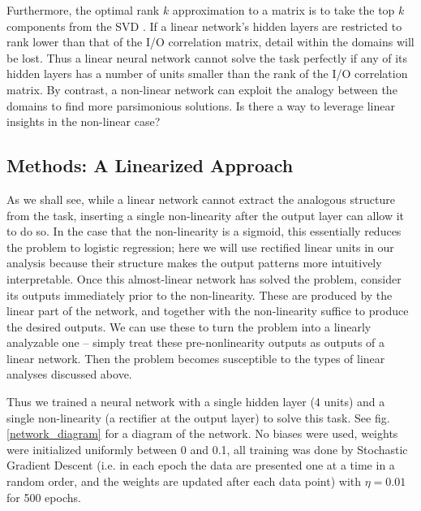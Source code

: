 \documentclass[10pt,letterpaper]{article}
\begin{document}
Furthermore, the optimal rank $k$ approximation to a matrix is to take the top $k$ components from the SVD \citep{Mirsky1960}. If a linear network's hidden layers are restricted to rank lower than that of the I/O correlation matrix, detail within the domains will be lost. Thus a linear neural network cannot solve the task perfectly if any of its hidden layers has a number of units smaller than the rank of the I/O correlation matrix. By contrast, a non-linear network can exploit the analogy between the domains to find more parsimonious solutions. Is there a way to leverage linear insights in the non-linear case?  
\subsection{Methods: A Linearized Approach}
As we shall see, while a linear network cannot extract the analogous structure from the task, inserting a single non-linearity after the output layer can allow it to do so. In the case that the non-linearity is a sigmoid, this essentially reduces the problem to logistic regression; here we will use rectified linear units in our analysis because their structure makes the output patterns more intuitively interpretable. Once this almost-linear network has solved the problem, consider its outputs immediately prior to the non-linearity. These are produced by the linear part of the network, and together with the non-linearity suffice to produce the desired outputs. We can use these to turn the problem into a linearly analyzable one -- simply treat these pre-nonlinearity outputs as outputs of a linear network. Then the problem becomes susceptible to the types of linear analyses discussed above.\par 
Thus we trained a neural network with a single hidden layer (4 units) and a single non-linearity (a rectifier at the output layer) to solve this task. See fig. \ref{network_diagram} for a diagram of the network. No biases were used, weights were initialized uniformly between 0 and 0.1, all training was done by Stochastic Gradient Descent (i.e. in each epoch the data are presented one at a time in a random order, and the weights are updated after each data point) with \(\eta = 0.01\) for 500 epochs. \par 
\end{document}

